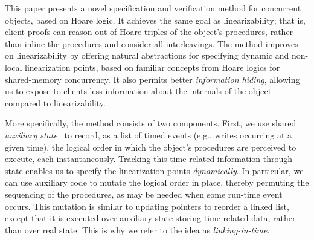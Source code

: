 \begin{comment}
\gad{Should we say here that previous/most approaches to reason with
  non-fixed linearization point do so with a dedicated
  meta-theory~\cite{QadeerST+tr09,LiangF+pldi13}?}

 \gad{Also, I don't like how the \code{readPair} fits here so far. We
   are ignoring the fact that you guys've already verified it in
   FCSL.}

\end{comment}
 
This paper presents a novel specification and verification method for
concurrent objects, based on Hoare logic. It achieves the same goal as
linearizability; that is, client proofs can reason out of Hoare
triples of the object's procedures, rather than inline the procedures
and consider all interleavings. The method improves on linearizability
by offering natural abstractions for specifying dynamic and non-local
linearization points, based on familiar concepts from Hoare logics for
shared-memory concurrency. It also permits better \emph{information
  hiding}, allowing us to expose to clients less information about the
internals of the object compared to linearizability.


More specifically, the method consists of two
components. First, we use shared \emph{auxiliary
  state}~\cite{Owicki-Gries:CACM76} to record, as a list of timed
events (e.g., writes occurring at a given time), the logical order in which the object's procedures are
perceived to execute, each instantaneously. Tracking this time-related
information through state enables us to specify the linearization
points \emph{dynamically}. In particular, we can use auxiliary
  code to mutate the logical order in place, thereby permuting
the sequencing of the procedures, as may be needed when some run-time
event occurs. This mutation is similar to updating pointers
to reorder a linked list, except that it is executed over
auxiliary state storing time-related data, rather than over real
state. This is why we refer to the idea as \emph{linking-in-time}.


